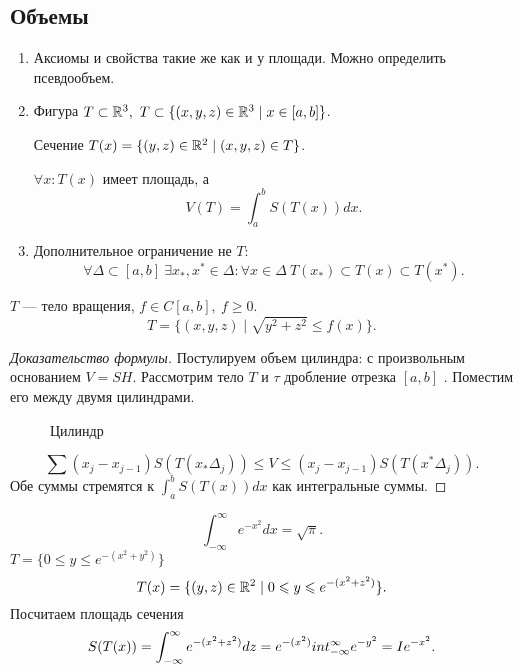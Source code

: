     \subsection{Объемы}
    \begin{enumerate}
	\item
	    Аксиомы и свойства такие же как и у площади.
	    Можно определить псевдообъем.
	\item Фигура $ T \subset \mathbb{R}^3, ~ T \subset \{(x, y, z) \in  \mathbb{R}^3 \mid x \in [a, b]\} $.

	    \begin{defn}
		Сечение $ T(x) = \{(y, z) \in \mathbb{R}^2 \mid (x, y, z) \in T \}$.
	    \end{defn}
	    $ \forall x : T(x)$ имеет площадь,
	    а \[
		V(T) = \int_{a}^{b}  S(T(x))dx
	    .\]
	\item Дополнительное ограничение не $ T$:
	    \[
		\forall  \Delta \subset [a, b] ~ \exists x_{*} , x^{*} \in  \Delta  : \forall x \in  \Delta ~ T(x_{*}) \subset T(x) \subset T(x^{*})
	    .\]
    \end{enumerate}
    \begin{ex}
	$ T$ --- тело вращения, $ f \in  C[a, b], ~ f \ge  0$.
	\[
	    T = \{(x, y, z) \mid \sqrt {y^2 + z^2} \le f(x) \}
	.\]
    \end{ex}
    \begin{proof}[Доказательство формулы]
	Постулируем объем цилиндра: с произвольным основанием $ V = S H$.
	Рассмотрим тело $ T$ и $ \tau$ дробление отрезка $[a, b]$ . Поместим его между двумя цилиндрами.
	\begin{figure}[ht]
	    \centering
	    \caption{Цилиндр}
	    \label{fig:cilinder}
	\end{figure}
	\[
	    \sum (x_j - x_{j-1}) S(T(x_{*} \Delta_j) )\le V \le (x_j - x_{j-1}) S(T(x^{*} \Delta_j))
	.\]
	Обе суммы стремятся к $ \int_{a}^{b} S(T(x))dx $ как интегральные суммы.
    \end{proof}
    \begin{ex}
	\[
	    \int_{-\infty}^{\infty} e^{-x^2} dx = \sqrt{\pi}
	.\]
	$ T = \{0 \le y \le e^{-(x^2+y^2)}\}$
	\[
	    T(x) = \{ (y, z) \in  \mathbb{R}^2 \mid 0 \leqslant  y \leqslant  e ^{-(x^2 +z^2)}\}
	.\]
	Посчитаем площадь сечения
	\[
	    S(T(x)) = \int_{-\infty}^{\infty} e^{-(x^2+z^2) } dz = e ^{-(x^2)} \\int_{-\infty}^{\infty} e ^{-y^2}  = I e^{-x^2}
	.\]
    \end{ex}
% 
